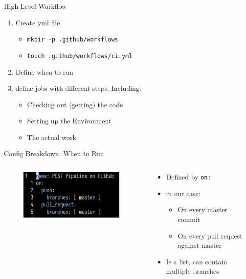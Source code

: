 \documentclass[compress,aspectratio=169]{beamer}
\begin{document}
	\begin{frame}{High Level Workflow}
    \begin{enumerate}
      \item Create yml file
        \begin{itemize}
          \item \texttt{mkdir -p .github/workflows}
          \item \texttt{touch .github/workflows/ci.yml}
        \end{itemize}
      \item Define when to run
      \item define jobs with different steps. Including:
        \begin{itemize}
          \item Checking out (getting) the code 
          \item Setting up the Environment
          \item The actual work
        \end{itemize}
    \end{enumerate}
	\end{frame}

	\begin{frame}{Config Breakdown: When to Run}
    \begin{columns}
      \begin{column}{0.5\textwidth}
        \begin{figure}
          \begin{center}
            \includegraphics[width=0.95\textwidth]{when.png}
          \end{center}
        \end{figure}
      \end{column}
      \begin{column}{0.5\textwidth}
        \begin{itemize}
          \item Defined by \texttt{on:}
          \item in our case:
          \begin{itemize}
            \item On every master commit
            \item On every pull request against master
          \end{itemize}
        \item Is a list, can contain multiple branches
        \end{itemize}
      \end{column}
    \end{columns}
	\end{frame}
\end{document}
